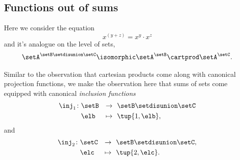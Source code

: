 
\subsection{Functions out of sums}

Here we consider the equation
\begin{equation}
    x^{(y + z)}           = x^y \cdot x^z
\end{equation}
and it's analogue on the level of sets,
\begin{equation}
    \setA^{\setB \setdisunion \setC}           \isomorphic \setA^\setB \cartprod \setA^\setC.
\end{equation}

Similar to the observation that cartesian products come along with canonical projection functions, we make the  observation here that sums of sets come equipped with canonical \emph{inclusion functions}
\begin{equation}
    \begin{aligned}
        \inj_1 \colon & \setB & \to     & \ \ \setB \setdisunion \setC \\
                      & \elb  & \mapsto & \ \  \tup{1, \elb},
    \end{aligned}
\end{equation}
and
\begin{equation}
    \begin{aligned}
        \inj_2 \colon & \setC & \to     & \ \ \setB \setdisunion \setC, \\
                      & \elc  & \mapsto & \ \  \tup{2, \elc}.
    \end{aligned}
\end{equation}

